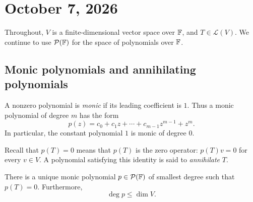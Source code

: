 \section{October 7, 2026}

Throughout, $V$ is a finite-dimensional vector space over $\mathbb{F}$,
and $T\in\mathcal L(V)$. We continue to use
$\mathcal P(\mathbb{F})$ for the space of polynomials over $\mathbb{F}$.

\subsection{Monic polynomials and annihilating polynomials}

\begin{definition}
  A nonzero polynomial is \emph{monic} if its leading coefficient
  is $1$. Thus a monic polynomial of degree $m$ has the form
  \[
    p(z)=c_0+c_1z+\cdots+c_{m-1}z^{m-1}+z^m.
  \]
  In particular, the constant polynomial $1$ is monic of degree $0$.
\end{definition}

Recall that $p(T)=0$ means that $p(T)$ is the zero operator:
$p(T)v=0$ for every $v\in V$. A polynomial satisfying this identity
is said to \emph{annihilate} $T$.

\begin{proposition}\label{prop:minimal-polynomial-existence}
  There is a unique monic polynomial $p\in\mathcal P(\mathbb{F})$
  of smallest degree such that $p(T)=0$. Furthermore,
  \[
    \deg p\leq\dim V.
  \]
\end{proposition}

